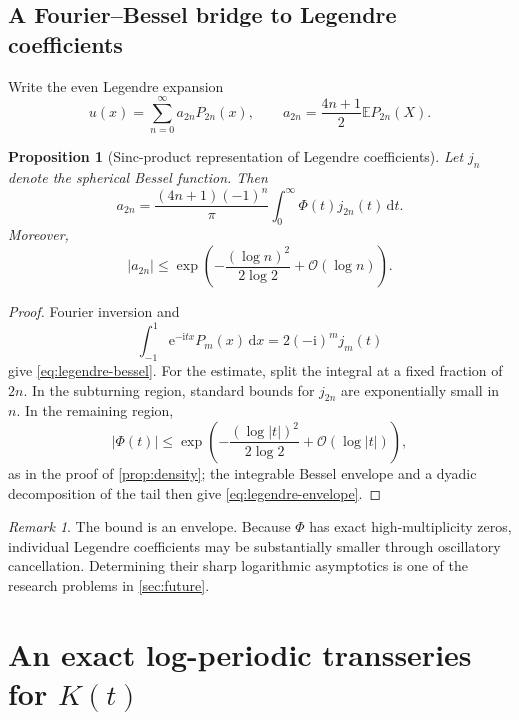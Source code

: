 \documentclass[11pt,oneside]{article}
\newtheorem{proposition}[theorem]{Proposition}
\theoremstyle{definition}
\theoremstyle{remark}
\newtheorem{remark}[theorem]{Remark}
\newcommand{\e}{\mathrm e}
\newcommand{\ii}{\mathrm i}
\newcommand{\dd}{\,\mathrm d}
\newcommand{\E}{\mathbb E}
\newcommand{\bigO}{\mathcal O}
\begin{document}
\subsection{A Fourier--Bessel bridge to Legendre coefficients}

Write the even Legendre expansion
\begin{equation}
 u(x)=\sum_{n=0}^{\infty}a_{2n}P_{2n}(x),
 \qquad
 a_{2n}=\frac{4n+1}{2}\E P_{2n}(X).
 \label{eq:Legendre}
\end{equation}

\begin{proposition}[Sinc-product representation of Legendre coefficients]
\label{prop:legendre-bessel}
Let \(j_n\) denote the spherical Bessel function.  Then
\begin{equation}
 \boxed{\displaystyle
 a_{2n}
 =\frac{(4n+1)(-1)^n}{\pi}
   \int_0^\infty \Phi(t)j_{2n}(t)\dd t.}
 \label{eq:legendre-bessel}
\end{equation}
Moreover,
\begin{equation}
 |a_{2n}|
 \leq
 \exp\!\left(
  -\frac{(\log n)^2}{2\log2}+\bigO(\log n)
 \right).
 \label{eq:legendre-envelope}
\end{equation}
\end{proposition}

\begin{proof}
Fourier inversion and
\[
 \int_{-1}^{1}\e^{-\ii tx}P_m(x)\dd x
 =2(-\ii)^m j_m(t)
\]
give \eqref{eq:legendre-bessel}.  For the estimate, split the integral at a
fixed fraction of \(2n\).  In the subturning region, standard bounds for
\(j_{2n}\) are exponentially small in \(n\).  In the remaining region,
\[
 |\Phi(t)|
 \leq
 \exp\!\left(
  -\frac{(\log|t|)^2}{2\log2}+\bigO(\log|t|)
 \right),
\]
as in the proof of \cref{prop:density}; the integrable Bessel envelope and a
dyadic decomposition of the tail then give \eqref{eq:legendre-envelope}.
\end{proof}

\begin{remark}
The bound is an envelope.  Because \(\Phi\) has exact high-multiplicity zeros,
individual Legendre coefficients may be substantially smaller through
oscillatory cancellation.  Determining their sharp logarithmic asymptotics is
one of the research problems in \cref{sec:future}.
\end{remark}

\section{An exact log-periodic transseries for \(K(t)\)}
\end{document}
